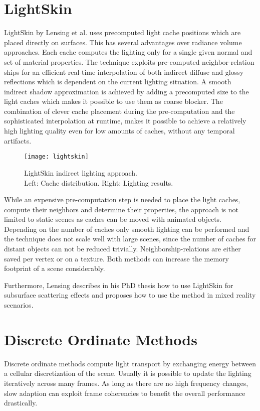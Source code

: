 \documentclass[thesis.tex]{subfiles}
\begin{document}
\section{LightSkin}
LightSkin \cite{bib:LightskinPaper} by Lensing et al. uses precomputed light cache positions which are placed directly on surfaces.
This has several advantages over radiance volume approaches.
Each cache computes the lighting only for a single given normal and set of material properties.
The technique exploits pre-computed neighbor-relation ships for an efficient real-time interpolation of both indirect diffuse and glossy reflections which is dependent on the current lighting situation.
A smooth indirect shadow approximation is achieved by adding a precomputed size to the light caches which makes it possible to use them as coarse blocker.
The combination of clever cache placement during the pre-computation and the sophisticated interpolation at runtime, makes it possible to achieve a relatively high lighting quality even for low amounts of caches, without any temporal artifacts.

\begin{figure}[h]
\centering
\texttt{[image: lightskin]}
\caption{\cite{bib:lightskinthesis} LightSkin indirect lighting approach.\\
Left: Cache distribution. Right: Lighting results. }
\end{figure}
While an expensive pre-computation step is needed to place the light caches, compute their neighbors and determine their properties, the approach is not limited to static scenes as caches can be moved with animated objects.
Depending on the number of caches only smooth lighting can be performed and the technique does not scale well with large scenes, since the number of caches for distant objects can not be reduced trivially.
Neighborship-relations are either saved per vertex or on a texture. 
Both methods can increase the memory footprint of a scene considerably.

Furthermore, Lensing describes in his PhD thesis \cite{bib:lightskinthesis} how to use LightSkin for subsurface scattering effects and proposes how to use the method in mixed reality scenarios.

\section{Discrete Ordinate Methods}
Discrete ordinate methods compute light transport by exchanging energy between a cellular discretization of the scene.
Usually it is possible to update the lighting iteratively across many frames.
As long as there are no high frequency changes, slow adaption can exploit frame coherencies to benefit the overall performance drastically.
\end{document}

